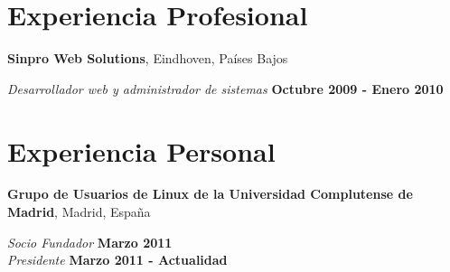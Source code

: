 \documentclass[margin,line]{resume}
\begin{document}
\begin{resume}
%
%
%
\section{\sc Experiencia Profesional}
{\bf Sinpro Web Solutions}, Eindhoven, Países Bajos

\vspace{-.3cm}
{\em Desarrollador web y administrador de sistemas} \hfill {\bf Octubre 2009 -
Enero 2010}\\


%
\section{\sc Experiencia Personal}
{\bf Grupo de Usuarios de Linux de la Universidad Complutense de
Madrid}, Madrid, España

\vspace{-.3cm}
{\em Socio Fundador} \hfill {\bf Marzo 2011}\\
{\em Presidente} \hfill {\bf Marzo 2011 - Actualidad}\\



\end{resume}
\end{document}
